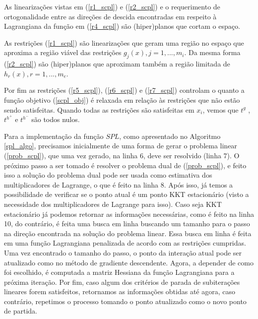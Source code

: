 As linearizações vistas em (\ref{r1_scpl}) e (\ref{r2_scpl}) e o requerimento de ortogonalidade entre
as direções de descida encontradas em respeito à Lagrangiana da função em (\ref{r4_scpl}) são (hiper)planos
que cortam o espaço.

As restrições (\ref{r1_scpl}) são linearizações que geram uma região no espaço que aproxima a região viável
das restrições \( g_j(x), j=1, ..., m_i \). Da mesma forma (\ref{r2_scpl}) são (hiper)planos que aproximam
também a região limitada de \( h_r(x), r=1, ..., m_e \).

Por fim as restrições (\ref{r5_scpl}), (\ref{r6_scpl}) e (\ref{r7_scpl}) controlam o quanto a função objetivo
(\ref{scpl_obj}) é relaxada em relação às restrições que não estão sendo satisfeitas. Quando todas as restrições
são satisfeitas em \(x_i\), vemos que \( t^g \) ,\(t^{h^+}\) e \(t^{h^-} \) são todos nulos.


Para a implementação da função \(SPL\), como apresentado no Algoritmo \ref{spl_algo}, precisamos inicialmente de uma forma de gerar o problema linear
(\ref{prob_scpl}), que uma vez gerado, na linha 6, deve ser resolvido (linha 7). O próximo passo a ser tomado é resolver
o problema dual de (\ref{prob_scpl}), e feito isso a solução do problema dual pode ser usada como estimativa
dos multiplicadores de Lagrange, o que é feito na linha 8. Após isso, já temos a possibilidade de verificar se o ponto atual é um
ponto KKT estacionário (visto a necessidade dos multiplicadores de Lagrange para isso). Caso seja KKT
estacionário já podemos retornar as informações necessárias, como é feito na linha 10, do contrário, é feita uma busca em linha
buscando um tamanho para o passo na direção encontrada na solução do problema linear. Essa busca em
linha é feita em uma função Lagrangiana penalizada de acordo com as restrições cumpridas. Uma vez
encontrado o tamanho do passo, o ponto da interação atual pode ser atualizado como no método de gradiente
descendente. Agora, a depender de como foi escolhido, é computada a matriz Hessiana da função Lagrangiana
para a próxima iteração. Por fim, caso algum dos critérios de parada de subiterações lineares forem
satisfeitos, retornamos as informações obtidas até agora, caso contrário, repetimos o processo tomando
o ponto atualizado como o novo ponto de partida.


